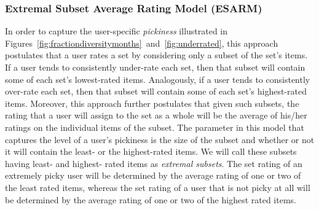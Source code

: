 \iffalse
Since we do not know the user's original item-level ratings, we use the user's
estimated ratings instead. That is,
\begin{equation} \label{avgSetEstEq}
  \begin{split}
    \hat{r}_{u}^s &= \frac{1}{|S|} \sum_{i \in \mathcal{S}} \hat{r}_{ui}.
  \end{split}
\end{equation}
\fi
   


\subsubsection*{Extremal Subset Average Rating Model (ESARM)}
In order to capture the user-specific \emph{pickiness} illustrated in Figures~\ref{fig:fractiondiversitymonths}~and~\ref{fig:underrated}, %
this approach postulates that a user rates a set by considering only a subset of the set's items. If a user tends to
consistently under-rate each set, then that subset will contain some of each
set's lowest-rated items. Analogously, if a
user tends to consistently over-rate each set, then that subset will contain
some of each set's highest-rated items.
Moreover, this approach further postulates that given such subsets, the rating
that a user will assign to the set as a
whole will be the average of his/her ratings on the individual items of the
subset. The parameter in this model that
captures the level of a user's pickiness is the size of the subset and whether
or not it will contain the least- or the
highest-rated items. We will call these subsets having least- and highest- rated
items as \emph{extremal subsets}. The set rating of an extremely picky user will be
determined by the average rating of one or two of
the least rated items, whereas the set rating of a user that is not picky at all
will be determined by the average rating of
one or two of the highest rated items. 

